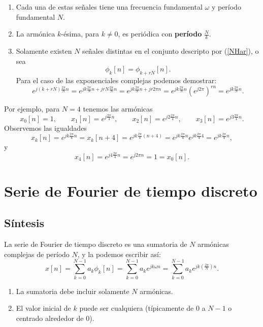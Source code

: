 \begin{enumerate}
	\item Cada una de estas señales tiene una frecuencia fundamental $\omega$ y período fundamental $N$.
	\item La armónica $k$-ésima, para $k \neq 0$, es periódica con \textbf{período} $\frac{N}{k}$.
	\item Solamente existen $N$ señales distintas en el conjunto descripto por (\ref{NHar}), o sea 
	\begin{equation}
		\phi_{k}[n] = \phi_{k+rN}[n].
	\end{equation}
	Para el caso de las exponenciales complejas podemos demostrar:
	\begin{equation}
		e^{j(k + rN)\frac{2\pi}{N}n} = e^{jk\frac{2\pi}{N}n + jrN\frac{2\pi}{N}n} = e^{jk\frac{2\pi}{N}n + jr2\pi n} = e^{jk\frac{2\pi}{N}n} (e^{j2\pi})^{rn} = e^{jk\frac{2\pi}{N}n}.
	\end{equation}
\end{enumerate}

Por ejemplo, para $N = 4$ tenemos las armónicas
\begin{equation}
	x_{0}[n] = 1, \qquad x_{1}[n] = e^{j\frac{2\pi}{4}n}, \qquad x_{2}[n] = e^{j2\frac{2\pi}{4}n}, \qquad x_{3}[n] = e^{j3\frac{2\pi}{4}n}.
\end{equation}
Observemos las igualdades
\begin{equation}
	x_{k}[n] = e^{jk\frac{2\pi}{4}n} = x_{k}[n + 4] = e^{jk\frac{2\pi}{4}(n + 4)} = e^{jk\frac{2\pi}{4}n} e^{jk\frac{2\pi}{4}4} = e^{jk\frac{2\pi}{4}n},
\end{equation}
y
\begin{equation}
	x_{4}[n] = e^{j4\frac{2\pi}{4}n} = e^{j2\pi n} = 1 = x_{0}[n].
\end{equation}

\section{Serie de Fourier de tiempo discreto}

\subsection{Síntesis}

La serie de Fourier de tiempo discreto es una sumatoria de $N$ armónicas complejas de período $N$, y la podemos escribir así:
\begin{equation}
	x[n] = \sum_{k=0}^{N-1} a_{k} \phi_{k}[n] = \sum_{k=0}^{N-1} a_{k} e^{jk\omega n} = \sum_{k=0}^{N-1} a_{k} e^{jk\left(\frac{2\pi}{N}\right)n}.
\end{equation}
\begin{enumerate}
	\item La sumatoria debe incluir solamente $N$ armónicas. 
	\item El valor inicial de $k$ puede ser cualquiera (típicamente de $0$ a $N-1$ o centrado alrededor de $0$).
\end{enumerate}

